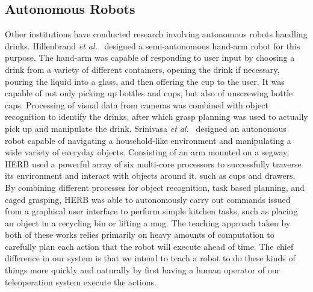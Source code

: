 \documentclass{sig-alternate}
\begin{document}
\subsection{Autonomous Robots}
\label{sec:autobots}
Other institutions have conducted research involving autonomous robots handling
drinks. Hillenbrand \textit{et al.}~\cite{pouring_arm} designed a 
semi-autonomous hand-arm robot for this purpose. The hand-arm was capable of 
responding to user input by choosing a drink from a variety of different 
containers, opening the drink if necessary, pouring the liquid into a glass, 
and then offering the cup to the user. It was capable of not only picking up 
bottles and cups, but also of unscrewing bottle caps. Processing of visual data
from cameras was combined with object recognition to identify the drinks, after
which grasp planning was used to actually pick up and manipulate the drink. 
Srinivasa \textit{et al.}~\cite{herb} designed an autonomous robot capable of 
navigating a household-like environment and manipulating a wide variety of 
everyday objects. Consisting of an arm mounted on a segway, HERB used a 
powerful array of six multi-core processors to successfully traverse its 
environment and interact with objects around it, such as cups and drawers. By 
combining different processes for object recognition, task based planning, and 
caged grasping, HERB was able to autonomously carry out commands issued from a 
graphical user interface to perform simple kitchen tasks, such as placing an 
object in a recycling bin or lifting a mug. The teaching approach taken by both
of these works relies primarily on heavy amounts of computation to carefully 
plan each action that the robot will execute ahead of time.  The chief 
difference in our system is that we intend to teach a robot to do these kinds
of things more quickly and naturally by first having a human operator of our 
teleoperation system execute the actions.
\end{document}
